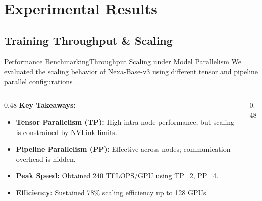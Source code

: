 \section{Experimental Results}
\subsection{Training Throughput \& Scaling}

\begin{frame}{Performance Benchmarking}{Throughput Scaling under Model Parallelism}
  We evaluated the scaling behavior of Nexa-Base-v3 using different tensor and pipeline parallel configurations~\cite{jenkins2025tensor}.
  
  \begin{columns}[T]
    \begin{column}{0.48\textwidth}
      \textbf{Key Takeaways:}
      \begin{itemize}
        \item \textbf{Tensor Parallelism (TP):} High intra-node performance, but scaling is constrained by NVLink limits.
        \item \textbf{Pipeline Parallelism (PP):} Effective across nodes; communication overhead is hidden.
        \item \textbf{Peak Speed:} Obtained 240 TFLOPS/GPU using TP=2, PP=4.
        \item \textbf{Efficiency:} Sustained 78\% scaling efficiency up to 128 GPUs.
      \end{itemize}
    \end{column}
    \hfill
    \begin{column}{0.48\textwidth}
      \centering
\end{column}
\end{columns}
\end{frame}
